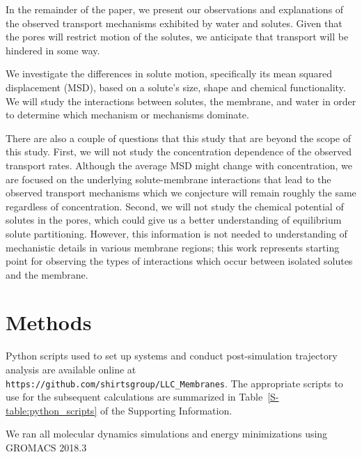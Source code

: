 \documentclass[journal=jpcbfk,manuscript=article]{achemso}
\begin{document}
  In
  the remainder of the paper, we present our observations 
  and explanations of the observed transport mechanisms exhibited by water
  and solutes. Given that the pores will restrict motion of the solutes, we
  anticipate that transport will be hindered in some way. 

  We investigate the differences in solute motion, specifically its mean 
  squared displacement (MSD), based on a solute's size, shape and chemical
  functionality. We will study the interactions between solutes, the membrane,
  and water in order to determine which mechanism or mechanisms dominate.
  
  There are also a couple of 
  questions
  that this study 
  that are beyond the scope of this study.
  First, we will not study the concentration dependence of the observed transport
  rates. Although the average MSD might change with concentration, we are 
  focused on the underlying solute-membrane interactions that lead to the 
  observed transport mechanisms which we conjecture will 
  remain roughly
  the same 
  regardless of concentration. Second, we will not study the chemical potential
  of solutes in the pores, which could give us a better understanding of 
  equilibrium solute partitioning. However, this information 
  is not needed to 
  understanding of mechanistic details in various membrane regions; 
  this work 
  represents
  starting point for observing
  the types of interactions which occur between isolated solutes and the
  membrane.

  \section{Methods}
  
  Python scripts used to set up systems and conduct post-simulation trajectory 
  analysis are available online at \texttt{https://github.com/shirtsgroup/LLC\_Membranes}. 
  The appropriate scripts to use for the subsequent calculations are summarized in 
  Table~\ref{S-table:python_scripts} of the Supporting Information.
  
  We ran all molecular dynamics simulations and energy minimizations using GROMACS 2018.3 \cite{bekker_gromacs:_1993,berendsen_gromacs:_1995,van_der_spoel_gromacs:_2005,hess_gromacs_2008} 
  
\end{document}
